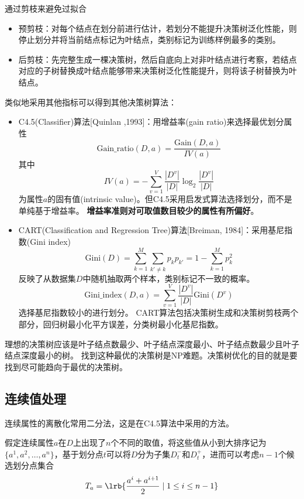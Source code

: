 通过剪枝来避免过拟合
\begin{itemize}
	\item 预剪枝：对每个结点在划分前进行估计，若划分不能提升决策树泛化性能，则停止划分并将当前结点标记为叶结点，类别标记为训练样例最多的类别。
	\item 后剪枝：先完整生成一棵决策树，然后自底向上对非叶结点进行考察，若结点对应的子树替换成叶结点能够带来决策树泛化性能提升，则将该子树替换为叶结点。
\end{itemize}

类似地采用其他指标可以得到其他决策树算法：
\begin{itemize}
	\item C4.5(Classifier)算法[Quinlan ,1993]：用增益率(gain ratio)来选择最优划分属性
	\[\text{Gain\_ratio}(D,a)=\frac{\text{Gain}(D,a)}{IV(a)}\]
	其中
	\[IV(a)=-\sum_{v=1}^V\frac{|D^v|}{|D|}\log_2\frac{|D^v|}{|D|}\]
	为属性$a$的固有值(intrinsic value)。但C4.5采用启发式算法选择划分，而不是单纯基于增益率。
	\textbf{增益率准则对可取值数目较少的属性有所偏好}。
	\item CART(Classification and Regression Tree)算法[Breiman, 1984]：采用基尼指数(Gini index)
	\[\text{Gini}(D)=\sum_{k=1}^{M}\sum_{k'\ne k}p_kp_{k'}=1-\sum_{k=1}^Mp_k^2\]
	反映了从数据集$D$中随机抽取两个样本，类别标记不一致的概率。
	\[\text{Gini\_index}(D,a)=\sum_{v=1}^V\frac{|D^v|}{|D|}\text{Gini}(D^v)\]
	选择基尼指数较小的进行划分。
	CART算法包括决策树生成和决策树剪枝两个部分，回归树最小化平方误差，分类树最小化基尼指数。
\end{itemize}

理想的决策树应该是叶子结点数最少、叶子结点深度最小、叶子结点数最少且叶子结点深度最小的树。
找到这种最优的决策树是NP难题。决策树优化的目的就是要找到尽可能趋向于最优的决策树。

\subsection{连续值处理}
连续属性的离散化常用二分法，这是在C4.5算法中采用的方法。

假定连续属性$a$在$D$上出现了$n$个不同的取值，将这些值从小到大排序记为$\{a^1,a^2,\ldots,a^n\}$，基于划分点$t$可以将$D$分为子集$D_t^-$和$D_t^+$，进而可以考虑$n-1$个候选划分点集合
\[T_a=\lrb{\frac{a^i+a^{i+1}}{2}\mid 1\leq i\leq n-1}\]

